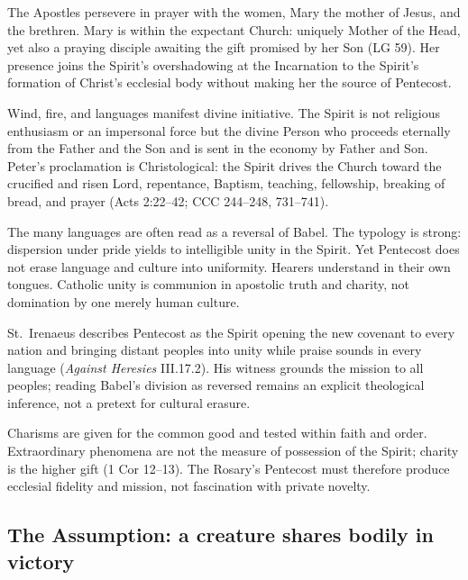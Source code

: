 The Apostles persevere in prayer with the women, Mary the mother of Jesus, and the brethren. Mary is within the expectant Church: uniquely Mother of the Head, yet also a praying disciple awaiting the gift promised by her Son (LG 59). Her presence joins the Spirit's overshadowing at the Incarnation to the Spirit's formation of Christ's ecclesial body without making her the source of Pentecost.

Wind, fire, and languages manifest divine initiative. The Spirit is not religious enthusiasm or an impersonal force but the divine Person who proceeds eternally from the Father and the Son and is sent in the economy by Father and Son. Peter's proclamation is Christological: the Spirit drives the Church toward the crucified and risen Lord, repentance, Baptism, teaching, fellowship, breaking of bread, and prayer (Acts 2:22--42; CCC 244--248, 731--741).

The many languages are often read as a reversal of Babel. The typology is strong: dispersion under pride yields to intelligible unity in the Spirit. Yet Pentecost does not erase language and culture into uniformity. Hearers understand in their own tongues. Catholic unity is communion in apostolic truth and charity, not domination by one merely human culture.

St.~Irenaeus describes Pentecost as the Spirit opening the new covenant to every nation and bringing distant peoples into unity while praise sounds in every language (\emph{Against Heresies} III.17.2). His witness grounds the mission to all peoples; reading Babel's division as reversed remains an explicit theological inference, not a pretext for cultural erasure.

Charisms are given for the common good and tested within faith and order. Extraordinary phenomena are not the measure of possession of the Spirit; charity is the higher gift (1 Cor 12--13). The Rosary's Pentecost must therefore produce ecclesial fidelity and mission, not fascination with private novelty.

\subsection{The Assumption: a creature shares bodily in victory}


